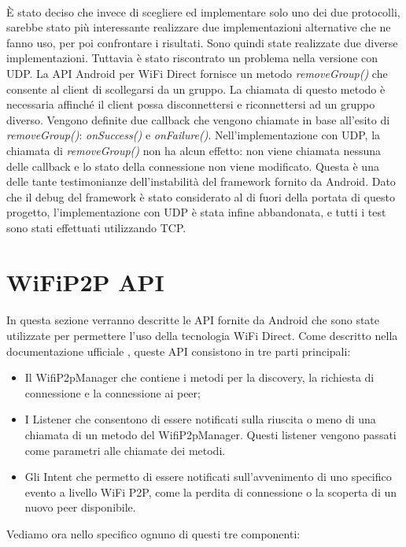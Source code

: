 \documentclass{llncs}
\begin{document}
\paragraph{} È stato deciso che invece di scegliere ed implementare solo uno dei due protocolli, sarebbe stato più interessante realizzare due implementazioni alternative che ne fanno uso, per poi confrontare i risultati. Sono quindi state realizzate due diverse implementazioni. Tuttavia è stato riscontrato un
problema nella versione con UDP. La API Android per WiFi Direct fornisce un metodo \emph{removeGroup()} che consente al client di scollegarsi da un gruppo. La chiamata di questo metodo è necessaria affinché il client possa disconnettersi e riconnettersi ad un gruppo diverso. Vengono definite due callback che vengono
chiamate in base all'esito di \emph{removeGroup()}: \emph{onSuccess()} e \emph{onFailure()}. Nell'implementazione con UDP, la chiamata di \emph{removeGroup()}
non ha alcun effetto: non viene chiamata nessuna delle callback e lo stato della connessione non viene modificato. Questa è una delle tante testimonianze
dell'instabilità del framework fornito da Android. Dato che il debug del framework è stato considerato al di fuori della portata di questo progetto,
l'implementazione con UDP è stata infine abbandonata, e tutti i test sono stati effettuati utilizzando TCP.
		
\section{WiFiP2P API} 
\paragraph{}In questa sezione verranno descritte le API fornite da Android che sono state utilizzate per permettere l'uso della tecnologia WiFi Direct. Come descritto nella documentazione ufficiale \cite{android}, queste API consistono in tre parti principali:

\begin{itemize}
	\item Il WifiP2pManager che contiene i metodi per la discovery, la richiesta di connessione e la connessione ai peer;
	\item I Listener che consentono di essere notificati sulla riuscita o meno di una chiamata di un metodo del WifiP2pManager. Questi listener vengono passati come parametri alle chiamate dei metodi.
	\item Gli Intent che permetto di essere notificati sull'avvenimento di uno specifico evento a livello WiFi P2P, come la perdita di connessione o la scoperta di un nuovo peer disponibile.
\end{itemize}
Vediamo ora nello specifico ognuno di questi tre componenti:
\end{document}

